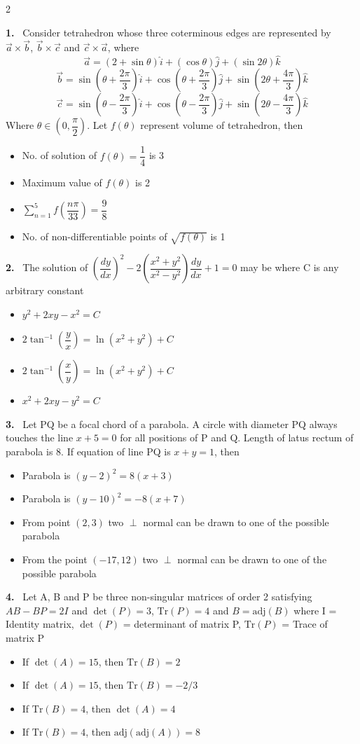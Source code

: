 \documentclass[10pt]{extarticle}
\newcommand{\qn}[1]{\par\smallskip\noindent\textbf{#1.}~}
\newenvironment{qoptions}{\begin{itemize}[leftmargin=1.8em,itemsep=1pt,topsep=2pt,label={}]}{\end{itemize}}
\newcommand{\opt}[2]{\item[(#1)] #2}
\begin{document}
\begin{multicols}{2}
\qn{1} Consider tetrahedron whose three coterminous edges are represented by $\vec a\times\vec b$, $\vec b\times\vec c$ and $\vec c\times\vec a$, where
$$\vec a = (2+\sin\theta)\hat i + (\cos\theta)\hat j + (\sin2\theta)\hat k$$
$$\vec b = \sin\left(\theta+\dfrac{2\pi}{3}\right)\hat i + \cos\left(\theta+\dfrac{2\pi}{3}\right)\hat j + \sin\left(2\theta+\dfrac{4\pi}{3}\right)\hat k$$
$$\vec c = \sin\left(\theta-\dfrac{2\pi}{3}\right)\hat i + \cos\left(\theta-\dfrac{2\pi}{3}\right)\hat j + \sin\left(2\theta-\dfrac{4\pi}{3}\right)\hat k$$
Where $\theta\in\left(0,\dfrac{\pi}{2}\right)$. Let $f(\theta)$ represent volume of tetrahedron, then
\begin{qoptions}
\opt{A}{No. of solution of $f(\theta) = \dfrac14$ is 3}
\opt{B}{Maximum value of $f(\theta)$ is 2}
\opt{C}{$\displaystyle\sum_{n=1}^{5} f\left(\dfrac{n\pi}{33}\right) = \dfrac{9}{8}$}
\opt{D}{No. of non-differentiable points of $\sqrt{f(\theta)}$ is 1}
\end{qoptions}

\qn{2} The solution of $\left(\dfrac{dy}{dx}\right)^2 - 2\left(\dfrac{x^2+y^2}{x^2-y^2}\right)\dfrac{dy}{dx} + 1 = 0$ may be where C is any arbitrary constant
\begin{qoptions}
\opt{A}{$y^2+2xy-x^2 = C$}
\opt{B}{$2\tan^{-1}\left(\dfrac{y}{x}\right) = \ln(x^2+y^2) + C$}
\opt{C}{$2\tan^{-1}\left(\dfrac{x}{y}\right) = \ln(x^2+y^2) + C$}
\opt{D}{$x^2+2xy-y^2 = C$}
\end{qoptions}

\qn{3} Let PQ be a focal chord of a parabola. A circle with diameter PQ always touches the line $x+5=0$ for all positions of P and Q. Length of latus rectum of parabola is 8. If equation of line PQ is $x+y=1$, then
\begin{qoptions}
\opt{A}{Parabola is $(y-2)^2 = 8(x+3)$}
\opt{B}{Parabola is $(y-10)^2 = -8(x+7)$}
\opt{C}{From point $(2,3)$ two $\perp$ normal can be drawn to one of the possible parabola}
\opt{D}{From the point $(-17,12)$ two $\perp$ normal can be drawn to one of the possible parabola}
\end{qoptions}

\qn{4} Let A, B and P be three non-singular matrices of order 2 satisfying $AB - BP = 2I$ and $\det(P) = 3$, $\mathrm{Tr}(P) = 4$ and $B = \mathrm{adj}(B)$ where I = Identity matrix, $\det(P)$ = determinant of matrix P, $\mathrm{Tr}(P)$ = Trace of matrix P
\begin{qoptions}
\opt{A}{If $\det(A) = 15$, then $\mathrm{Tr}(B) = 2$}
\opt{B}{If $\det(A) = 15$, then $\mathrm{Tr}(B) = -2/3$}
\opt{C}{If $\mathrm{Tr}(B) = 4$, then $\det(A) = 4$}
\opt{D}{If $\mathrm{Tr}(B) = 4$, then $\mathrm{adj}(\mathrm{adj}(A)) = 8$}
\end{qoptions}


\end{multicols}
\end{document}
